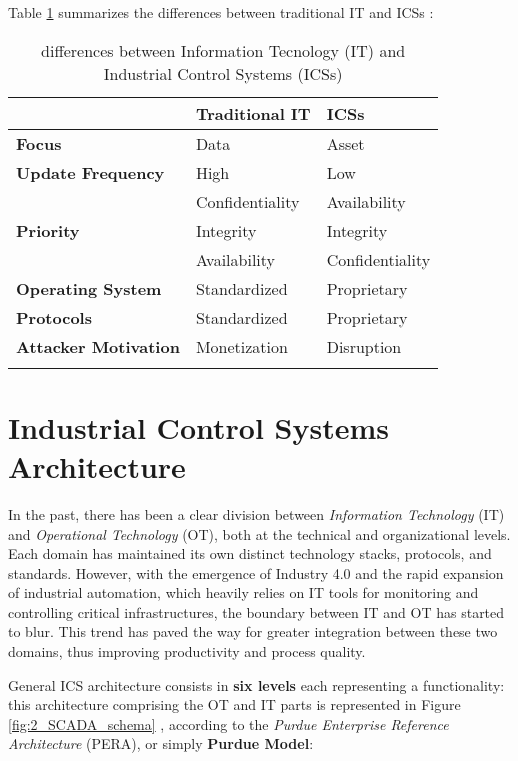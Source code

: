 \bigskip
\noindent Table \ref{table:2_it_ot_difference} summarizes the differences between traditional IT and ICSs \cite{tesi_phd_norvegese}:

\bigskip
\begin{longtable}[c]{p{}  p{}  p{}}
	\hline
	& \textbf{Traditional IT} & \textbf{ICSs} \\ [0.5ex] 
	\hline
	\textbf{Focus} & Data & Asset \\
	\hline
	\textbf{Update Frequency} & High & Low \\
	\hline 
	\multirow{3}{4em}{\textbf{Priority}} & Confidentiality & Availability \\
	& Integrity & Integrity \\
	& Availability & Confidentiality \\
	\hline
	\textbf{Operating System} & Standardized & Proprietary \\
	\hline
	\textbf{Protocols} & Standardized & Proprietary \\
	\hline
	\textbf{Attacker Motivation} & Monetization & Disruption \\
	\hline
	
	\caption{differences between Information Tecnology (IT) and Industrial Control Systems (ICSs)}
	\label{table:2_it_ot_difference}
\end{longtable}
\vfill

\section{Industrial Control Systems Architecture}
\label{sec:2_ics_components}
In the past, there has been a clear division between \textit{Information Technology} (IT) and \textit{Operational Technology} (OT), both at the technical and organizational levels. Each domain has maintained its own distinct technology stacks, protocols, and standards. However, with the emergence of Industry 4.0 and the rapid expansion of industrial automation, which heavily relies on IT tools for monitoring and controlling critical infrastructures, the boundary between IT and OT has started to blur. This trend has paved the way for greater integration between these two domains, thus improving productivity and process quality.

\bigskip
General ICS architecture consists in \textbf{six levels} each representing a functionality: this architecture comprising the OT and IT parts is represented in Figure \ref{fig:2_SCADA_schema} \cite{purdue_model}\cite{tesi_phd_norvegese}, according to the \textit{Purdue Enterprise Reference Architecture} (PERA), or simply \textbf{Purdue Model}:

